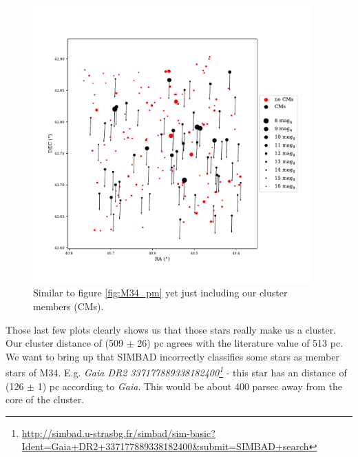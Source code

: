 \documentclass{article}
\begin{document}
\begin{figure}[H]
  \centering
    \includegraphics[trim={0 1.6cm 0 2.3cm},clip,width=0.95\textwidth]{M34_pm_mask.pdf}
  \caption{Similar to figure \ref{fig:M34_pm} yet just including our cluster members (CMs).}
  \label{fig:M34_pm_mask}
\end{figure}

Those last few plots clearly shows us that those stars really make us a cluster. Our cluster distance of (509 $\pm$ 26) pc agrees with the literature value of 513 pc. We want to bring up that SIMBAD incorrectly classifies some stars as member stars of M34. E.g. \textit{Gaia DR2 337177889338182400\footnote{\url{http://simbad.u-strasbg.fr/simbad/sim-basic?Ident=Gaia+DR2+337177889338182400&submit=SIMBAD+search}}} - this star has an distance of (126 $\pm$ 1) pc according to \textit{Gaia}. This would be about 400 parsec away from the core of the cluster. 

\end{document}
